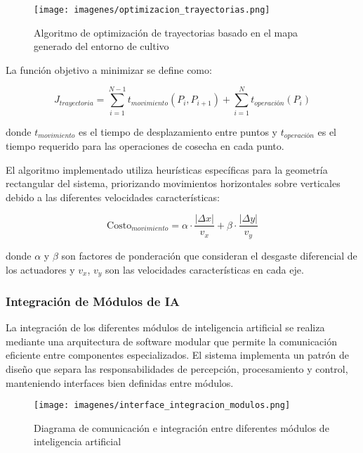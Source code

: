 \begin{figure}[h]
\centering
\texttt{[image: imagenes/optimizacion\_trayectorias.png]}
\caption{Algoritmo de optimización de trayectorias basado en el mapa generado del entorno de cultivo}
\label{fig:optimizacion_trayectorias}
\end{figure}

La función objetivo a minimizar se define como:

\begin{equation}
J_{trayectoria} = \sum_{i=1}^{N-1} t_{movimiento}(P_i, P_{i+1}) + \sum_{i=1}^{N} t_{operación}(P_i)
\end{equation}

donde $t_{movimiento}$ es el tiempo de desplazamiento entre puntos y $t_{operación}$ es el tiempo requerido para las operaciones de cosecha en cada punto.

El algoritmo implementado utiliza heurísticas específicas para la geometría rectangular del sistema, priorizando movimientos horizontales sobre verticales debido a las diferentes velocidades características:

\begin{equation}
\text{Costo}_{movimiento} = \alpha \cdot \frac{|\Delta x|}{v_x} + \beta \cdot \frac{|\Delta y|}{v_y}
\end{equation}

donde $\alpha$ y $\beta$ son factores de ponderación que consideran el desgaste diferencial de los actuadores y $v_x$, $v_y$ son las velocidades características en cada eje.

\subsubsection{Integración de Módulos de IA}

La integración de los diferentes módulos de inteligencia artificial se realiza mediante una arquitectura de software modular que permite la comunicación eficiente entre componentes especializados. El sistema implementa un patrón de diseño que separa las responsabilidades de percepción, procesamiento y control, manteniendo interfaces bien definidas entre módulos.

\begin{figure}[h]
\centering
\texttt{[image: imagenes/interface\_integracion\_modulos.png]}
\caption{Diagrama de comunicación e integración entre diferentes módulos de inteligencia artificial}
\label{fig:interface_integracion}
\end{figure}

